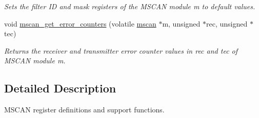 \begin{DoxyCompactItemize}
\begin{DoxyCompactList}\small\item\em Sets the filter ID and mask registers of the M\+S\+C\+AN module {\itshape m} to default values. \end{DoxyCompactList}\item 
void \mbox{\hyperlink{group__RTEMSBSPsPowerPCGen5200MSCAN_ga0f5f444e543a0629b59ee4e286ee30d8}{mscan\+\_\+get\+\_\+error\+\_\+counters}} (volatile \mbox{\hyperlink{group__RTEMSBSPsPowerPCGen5200MSCAN_gacfd56a4a482c5e7da2cff003284b2d51}{mscan}} $\ast$m, unsigned $\ast$rec, unsigned $\ast$tec)
\begin{DoxyCompactList}\small\item\em Returns the receiver and transmitter error counter values in {\itshape rec} and {\itshape tec} of M\+S\+C\+AN module {\itshape m}. \end{DoxyCompactList}\end{DoxyCompactItemize}


\subsection{Detailed Description}
M\+S\+C\+AN register definitions and support functions. 

